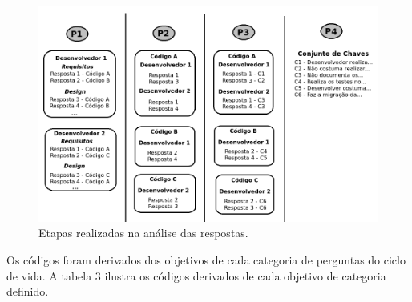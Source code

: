 \begin{figure}[h]
	\centering
	\label{fig02}
		\includegraphics[scale=0.7]{figuras/Esquematico_Analise_2}
	\caption{Etapas realizadas na análise das respostas.}
\end{figure}

Os códigos foram derivados dos objetivos de cada categoria de perguntas do ciclo de vida. A tabela 3 ilustra os códigos derivados de cada objetivo de categoria definido.

